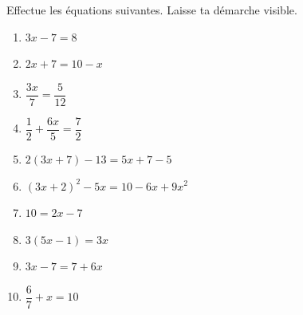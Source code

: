 %
%
    Effectue les équations suivantes. Laisse ta démarche visible.
    \begin{enumerate}[cols=2, itemsep=0.7cm]
        \item \(3x - 7 = 8\)
        \item \(2x + 7 = 10 - x\)
        \item \(\dfrac{3x}{7} = \dfrac{5}{12}\)
        \item \(\dfrac{1}{2} + \dfrac{6x}{5} = \dfrac{7}{2}\)
        \item \(2(3x + 7) - 13 = 5x + 7 - 5\)
        \item \((3x + 2)^2 - 5x = 10 - 6x + 9x^2\)
        \item \(10 = 2x - 7\)
        \item \(3(5x-1) = 3x\)
        \item \(3x-7 = 7 + 6x\)
        \item \(\dfrac{6}{7} + x = 10\)
    \end{enumerate}
